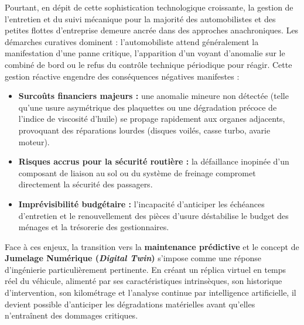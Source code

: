 \documentclass[12pt,a4paper,twoside,openright]{report}
\newcommand{\itembullet}{\textcolor{secondaryBlue}{$\blacktriangleright$}}
\begin{document}
  Pourtant, en d\'epit de cette sophistication technologique croissante, la gestion de l'entretien et du suivi m\'ecanique pour la majorit\'e des automobilistes et des petites flottes d'entreprise demeure ancr\'ee dans des approches anachroniques. Les d\'emarches curatives dominent : l'automobiliste attend g\'en\'eralement la manifestation d'une panne critique, l'apparition d'un voyant d'anomalie sur le combin\'e de bord ou le refus du contr\^ole technique p\'eriodique pour r\'eagir. Cette gestion r\'eactive engendre des cons\'equences n\'egatives manifestes :
  \begin{itemize}[label=\itembullet]
    \item \textbf{Surco\^uts financiers majeurs :} une anomalie mineure non d\'etect\'ee (telle qu'une usure asym\'etrique des plaquettes ou une d\'egradation pr\'ecoce de l'indice de viscosit\'e d'huile) se propage rapidement aux organes adjacents, provoquant des r\'eparations lourdes (disques voil\'es, casse turbo, avarie moteur).
    \item \textbf{Risques accrus pour la s\'ecurit\'e routi\`ere :} la d\'efaillance inopin\'ee d'un composant de liaison au sol ou du syst\`eme de freinage compromet directement la s\'ecurit\'e des passagers.
    \item \textbf{Impr\'evisibilit\'e budg\'etaire :} l'incapacit\'e d'anticiper les \'ech\'eances d'entretien et le renouvellement des pi\`eces d'usure d\'estabilise le budget des m\'enages et la tr\'esorerie des gestionnaires.
  \end{itemize}

  Face \`a ces enjeux, la transition vers la \textbf{maintenance pr\'edictive} et le concept de \textbf{Jumelage Num\'erique (\textit{Digital Twin})} s'impose comme une r\'eponse d'ing\'enierie particuli\`erement pertinente. En cr\'eant un r\'eplica virtuel en temps r\'eel du v\'ehicule, aliment\'e par ses caract\'eristiques intrins\`eques, son historique d'intervention, son kilom\'etrage et l'analyse continue par intelligence artificielle, il devient possible d'anticiper les d\'egradations mat\'erielles avant qu'elles n'entra\^inent des dommages critiques.
\end{document}
